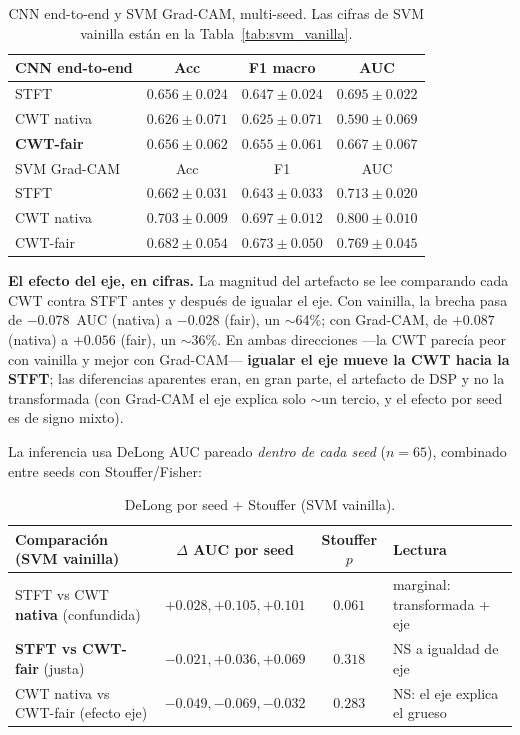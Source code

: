 \documentclass[11pt, a4paper]{article}
\begin{document}
\begin{table}[H]
\centering
\small
\begin{tabular}{lccc}
\toprule
CNN end-to-end & Acc & F1 macro & AUC \\
\midrule
STFT & $0.656 \pm 0.024$ & $0.647 \pm 0.024$ & $0.695 \pm 0.022$ \\
CWT nativa & $0.626 \pm 0.071$ & $0.625 \pm 0.071$ & $0.590 \pm 0.069$ \\
\textbf{CWT-fair} & $0.656 \pm 0.062$ & $0.655 \pm 0.061$ & $\mathbf{0.667 \pm 0.067}$ \\
\midrule
SVM Grad-CAM & Acc & F1 & AUC \\
\midrule
STFT & $0.662 \pm 0.031$ & $0.643 \pm 0.033$ & $0.713 \pm 0.020$ \\
CWT nativa & $\mathbf{0.703 \pm 0.009}$ & $\mathbf{0.697 \pm 0.012}$ & $\mathbf{0.800 \pm 0.010}$ \\
CWT-fair & $0.682 \pm 0.054$ & $0.673 \pm 0.050$ & $0.769 \pm 0.045$ \\
\bottomrule
\end{tabular}
\caption{CNN end-to-end y SVM Grad-CAM, multi-seed. Las cifras de SVM
vainilla están en la Tabla~\ref{tab:svm_vanilla}.}
\end{table}

\textbf{El efecto del eje, en cifras.} La magnitud del artefacto se lee
comparando cada CWT contra STFT antes y después de igualar el eje. Con
vainilla, la brecha pasa de $-0.078$~AUC (nativa) a $\mathbf{-0.028}$
(fair), un $\sim$64\%; con Grad-CAM, de $+0.087$ (nativa) a
$\mathbf{+0.056}$ (fair), un $\sim$36\%. En ambas direcciones ---la CWT
parecía peor con vainilla y mejor con Grad-CAM--- \textbf{igualar el eje
mueve la CWT hacia la STFT}; las diferencias aparentes eran, en gran parte,
el artefacto de DSP y no la transformada (con Grad-CAM el eje explica solo
$\sim$un tercio, y el efecto por seed es de signo mixto).

La inferencia usa DeLong AUC pareado \emph{dentro de cada seed} ($n=65$),
combinado entre seeds con Stouffer/Fisher:

\begin{table}[H]
\centering
\small
\begin{tabular}{lccl}
\toprule
Comparación (SVM vainilla) & $\Delta$ AUC por seed & Stouffer $p$ & Lectura \\
\midrule
STFT vs CWT \textbf{nativa} (confundida) & $+0.028, +0.105, +0.101$ & $\mathbf{0.061}$ & marginal: transformada + eje \\
\textbf{STFT vs CWT-fair} (justa) & $-0.021, +0.036, +0.069$ & $\mathbf{0.318}$ & NS a igualdad de eje \\
CWT nativa vs CWT-fair (efecto eje) & $-0.049, -0.069, -0.032$ & $\mathbf{0.283}$ & NS: el eje explica el grueso \\
\bottomrule
\end{tabular}
\caption{DeLong por seed + Stouffer (SVM vainilla).}
\label{tab:delong}
\end{table}
\end{document}
